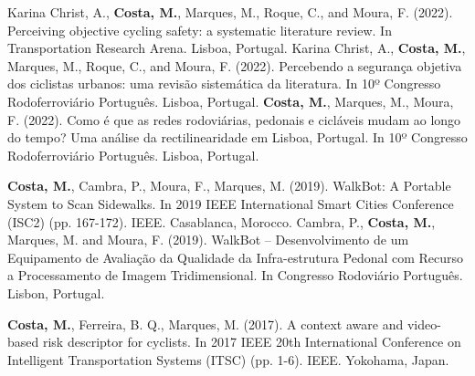\begin{cvpublications}

\cvpublication
	{Karina Christ, A., \textbf{Costa, M.}, Marques, M., Roque, C., and Moura, F. (2022). Perceiving objective cycling safety: a systematic literature review. In Transportation Research Arena. Lisboa, Portugal.}	
  \cvpublication
    {Karina Christ, A., \textbf{Costa, M.}, Marques, M., Roque, C., and Moura, F. (2022). Percebendo a segurança objetiva dos ciclistas urbanos: uma revisão sistemática da literatura. In 10º Congresso Rodoferroviário Português. Lisboa, Portugal.}
  \cvpublication
    {\textbf{Costa, M.}, Marques, M., Moura, F. (2022). Como é que as redes rodoviárias, pedonais e cicláveis mudam ao longo do tempo? Uma análise da rectilinearidade em Lisboa, Portugal. In 10º Congresso Rodoferroviário Português. Lisboa, Portugal.}

\end{cvpublications}


\begin{cvpublications}
  \cvpublication
    {\textbf{Costa, M.}, Cambra, P., Moura, F., Marques, M. (2019). WalkBot: A Portable System to Scan Sidewalks. In 2019 IEEE International Smart Cities Conference (ISC2) (pp. 167-172). IEEE. Casablanca, Morocco.}
  \cvpublication
    {Cambra, P., \textbf{Costa, M.}, Marques, M. and Moura, F. (2019). WalkBot – Desenvolvimento de um Equipamento de Avaliação da Qualidade da Infra-estrutura Pedonal com Recurso a Processamento de Imagem Tridimensional. In Congresso Rodoviário Português. Lisbon, Portugal.}

\end{cvpublications}


\begin{cvpublications}
  \cvpublication
    {\textbf{Costa, M.}, Ferreira, B. Q., Marques, M. (2017). A context aware and video-based risk descriptor for cyclists. In 2017 IEEE 20th International Conference on Intelligent Transportation Systems (ITSC) (pp. 1-6). IEEE. Yokohama, Japan.}

\end{cvpublications}

